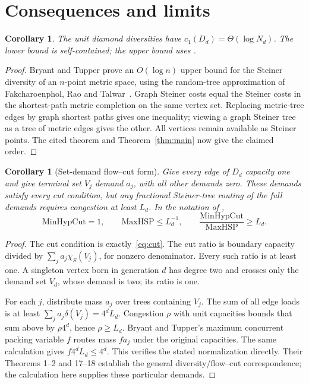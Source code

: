 \documentclass[11pt]{article}
\newtheorem{corollary}[theorem]{Corollary}
\newcommand{\cut}{\chi}
\begin{document}
\section{Consequences and limits}
\begin{corollary}\label{cor:order}
The unit diamond diversities have $c_1(D_d)=\Theta(\log N_d)$.
The lower bound is self-contained; the upper bound uses
\cite[Theorem 2]{BTopen}.
\end{corollary}
\begin{proof}
Bryant and Tupper prove an $O(\log n)$ upper bound for the Steiner diversity
of an $n$-point metric space, using the random-tree approximation of
Fakcharoenphol, Rao and Talwar~\cite{FRT}. Graph Steiner costs equal the Steiner costs
in the shortest-path metric completion on the same vertex set. Replacing
metric-tree edges by graph shortest paths gives one inequality; viewing a
graph Steiner tree as a tree of metric edges gives the other. All vertices
remain available as Steiner points. The cited theorem and
Theorem~\ref{thm:main} now give the claimed order.
\end{proof}

\begin{corollary}[Set-demand flow--cut form]\label{cor:flow}
Give every edge of $D_d$ capacity one and give terminal set $V_j$ demand
$a_j$, with all other demands zero. These demands satisfy every cut
condition, but any fractional Steiner-tree routing of the full demands
requires congestion at least $L_d$. In the notation of
\cite[Section 5]{BT14},
\[
\mathrm{MinHypCut}=1,\qquad \mathrm{MaxHSP}\le L_d^{-1},\qquad
\frac{\mathrm{MinHypCut}}{\mathrm{MaxHSP}}\ge L_d.
\]
\end{corollary}
\begin{proof}
The cut condition is exactly~\eqref{eq:cut}. The cut ratio is boundary
capacity divided by $\sum_j a_j\cut_S(V_j)$, for nonzero denominator. Every
such ratio is at least one. A singleton vertex born in generation $d$
has degree two and crosses only the demand set $V_d$, whose demand is two;
its ratio is one.

For each $j$, distribute mass $a_j$ over trees containing $V_j$. The sum of
all edge loads is at least $\sum_j a_j\delta(V_j)=4^dL_d$. Congestion $\rho$
with unit capacities bounds that sum above by $\rho4^d$, hence
$\rho\ge L_d$. Bryant and Tupper's maximum concurrent packing variable
$f$ routes mass $fa_j$ under the original capacities. The same calculation
gives $f4^dL_d\le4^d$. This verifies the stated normalization directly.
Their Theorems 1--2 and 17--18 establish the general diversity/flow--cut
correspondence; the calculation here supplies these particular demands.
\end{proof}
\end{document}

